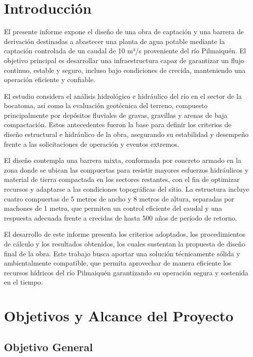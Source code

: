 \documentclass{article} %
\begin{document}
\newpage
\tableofcontents %
\newpage
\section{Introducción}

El presente informe expone el diseño de una obra de captación y una barrera de derivación destinadas a abastecer una planta de agua potable mediante la captación controlada de un caudal de 10 m³/s proveniente del río Pilmaiquén. El objetivo principal es desarrollar una infraestructura capaz de garantizar un flujo continuo, estable y seguro, incluso bajo condiciones de crecida, manteniendo una operación eficiente y confiable.

El estudio considera el análisis hidrológico e hidráulico del río en el sector de la bocatoma, así como la evaluación geotécnica del terreno, compuesto principalmente por depósitos fluviales de gravas, gravillas y arenas de baja compactación. Estos antecedentes fueron la base para definir los criterios de diseño estructural e hidráulico de la obra, asegurando su estabilidad y desempeño frente a las solicitaciones de operación y eventos extremos.

El diseño contempla una barrera mixta, conformada por concreto armado en la zona donde se ubican las compuertas para resistir mayores esfuerzos hidráulicos y material de tierra compactada en los sectores restantes, con el fin de optimizar recursos y adaptarse a las condiciones topográficas del sitio. La estructura incluye cuatro compuertas de 5 metros de ancho y 8 metros de altura, separadas por machones de 1 metro, que permiten un control eficiente del caudal y una respuesta adecuada frente a crecidas de hasta 500 años de período de retorno.

El desarrollo de este informe presenta los criterios adoptados, los procedimientos de cálculo y los resultados obtenidos, los cuales sustentan la propuesta de diseño final de la obra. Este trabajo busca aportar una solución técnicamente sólida y ambientalmente compatible, que permita aprovechar de manera eficiente los recursos hídricos del río Pilmaiquén garantizando su operación segura y sostenida en el tiempo.

\newpage
\section{Objetivos y Alcance del Proyecto}

\subsection{Objetivo General}
\end{document}
